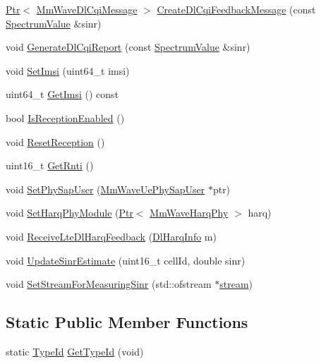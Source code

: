 \begin{DoxyCompactItemize}
\item 
\hyperlink{classns3_1_1Ptr}{Ptr}$<$ \hyperlink{classns3_1_1MmWaveDlCqiMessage}{Mm\+Wave\+Dl\+Cqi\+Message} $>$ \hyperlink{classns3_1_1MmWaveUePhy_ace824533773bfbf7b1d1349540110913}{Create\+Dl\+Cqi\+Feedback\+Message} (const \hyperlink{classns3_1_1SpectrumValue}{Spectrum\+Value} \&sinr)
\item 
void \hyperlink{classns3_1_1MmWaveUePhy_a94ad8ac60220078f5b5928018fb0e933}{Generate\+Dl\+Cqi\+Report} (const \hyperlink{classns3_1_1SpectrumValue}{Spectrum\+Value} \&sinr)
\item 
void \hyperlink{classns3_1_1MmWaveUePhy_ae749d4662b5da2f23f0e8b668c237793}{Set\+Imsi} (uint64\+\_\+t imsi)
\item 
uint64\+\_\+t \hyperlink{classns3_1_1MmWaveUePhy_a330617eaa20142dd53bbeec2a8c38bbf}{Get\+Imsi} () const 
\item 
bool \hyperlink{classns3_1_1MmWaveUePhy_a525d399628306b3d6b123d9049bb96c5}{Is\+Reception\+Enabled} ()
\item 
void \hyperlink{classns3_1_1MmWaveUePhy_a76004b601b39c91029791f3595388de8}{Reset\+Reception} ()
\item 
uint16\+\_\+t \hyperlink{classns3_1_1MmWaveUePhy_a10ec5ed6f03be35dc4244e956c23db09}{Get\+Rnti} ()
\item 
void \hyperlink{classns3_1_1MmWaveUePhy_a75e2611e40cdbcd99cfd037a3059f7dc}{Set\+Phy\+Sap\+User} (\hyperlink{classns3_1_1MmWaveUePhySapUser}{Mm\+Wave\+Ue\+Phy\+Sap\+User} $\ast$ptr)
\item 
void \hyperlink{classns3_1_1MmWaveUePhy_a842c9f3d59123c373b27b8b7868831ae}{Set\+Harq\+Phy\+Module} (\hyperlink{classns3_1_1Ptr}{Ptr}$<$ \hyperlink{classns3_1_1MmWaveHarqPhy}{Mm\+Wave\+Harq\+Phy} $>$ harq)
\item 
void \hyperlink{classns3_1_1MmWaveUePhy_ac00ac37c527f89a4e7a585cef8b95f4d}{Receive\+Lte\+Dl\+Harq\+Feedback} (\hyperlink{structns3_1_1DlHarqInfo}{Dl\+Harq\+Info} m)
\item 
void \hyperlink{classns3_1_1MmWaveUePhy_a64cf1657911ecf35268562931f3525bd}{Update\+Sinr\+Estimate} (uint16\+\_\+t cell\+Id, double sinr)
\item 
void \hyperlink{classns3_1_1MmWaveUePhy_aae6452f06ea6d68b0dd4c1e066acef8a}{Set\+Stream\+For\+Measuring\+Sinr} (std\+::ofstream $\ast$\hyperlink{classns3_1_1MmWaveUePhy_a90953f3aea8003a19f264b061f828507}{stream})
\end{DoxyCompactItemize}
\subsection*{Static Public Member Functions}
\begin{DoxyCompactItemize}
\item 
static \hyperlink{classns3_1_1TypeId}{Type\+Id} \hyperlink{classns3_1_1MmWaveUePhy_a378cee109a961a6a4c0a88bfb373a087}{Get\+Type\+Id} (void)
\end{DoxyCompactItemize}
